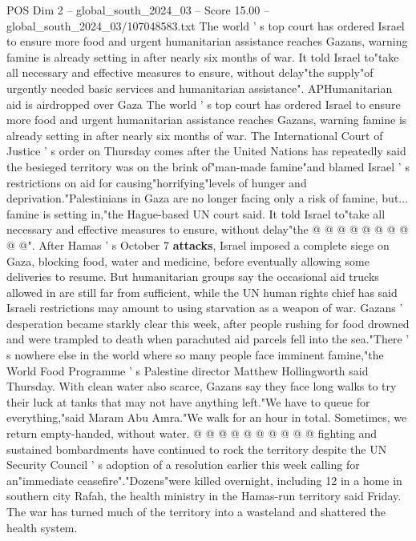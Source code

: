 \begin{textsample}{POS Dim 2 – global\_south\_2024\_03 – Score 15.00 – global\_south\_2024\_03/107048583.txt}  \label{ex:f2_pos_335}
The world ' s top court has ordered Israel to ensure more food and urgent humanitarian assistance reaches Gazans, warning famine is already setting in after nearly six months of war.
It told Israel to"take all necessary and effective measures to ensure, without delay"the supply"of urgently needed basic services and humanitarian assistance".
APHumanitarian aid is airdropped over Gaza The world ' s top court has ordered Israel to ensure more food and urgent humanitarian assistance reaches Gazans, warning famine is already setting in after nearly six months of war.
The International Court of Justice ' s order on Thursday comes after the United Nations has repeatedly said the besieged territory was on the brink of"man-made famine"and blamed Israel ' s restrictions on aid for causing"horrifying"levels of hunger and deprivation."Palestinians in Gaza are no longer facing only a risk of famine, but... famine is setting in,"the Hague-based UN court said.
It told Israel to"take all necessary and effective measures to ensure, without delay"the @ @ @ @ @ @ @ @ @ @".
After Hamas ' s October 7 \textbf{attacks}, Israel imposed a complete siege on Gaza, blocking food, water and medicine, before eventually allowing some deliveries to resume.
But humanitarian groups say the occasional aid trucks allowed in are still far from sufficient, while the UN human rights chief has said Israeli restrictions may amount to using starvation as a weapon of war.
Gazans ' desperation became starkly clear this week, after people rushing for food drowned and were trampled to death when parachuted aid parcels fell into the sea."There ' s nowhere else in the world where so many people face imminent famine,"the World Food Programme ' s Palestine director Matthew Hollingworth said Thursday.
With clean water also scarce, Gazans say they face long walks to try their luck at tanks that may not have anything left."We have to queue for everything,"said Maram Abu Amra."We walk for an hour in total.
Sometimes, we return empty-handed, without water. @ @ @ @ @ @ @ @ @ @ fighting and sustained bombardments have continued to rock the territory despite the UN Security Council ' s adoption of a resolution earlier this week calling for an"immediate ceasefire"."Dozens"were killed overnight, including 12 in a home in southern city Rafah, the health ministry in the Hamas-run territory said Friday.
The war has turned much of the territory into a wasteland and shattered the health system.

\end{textsample}
